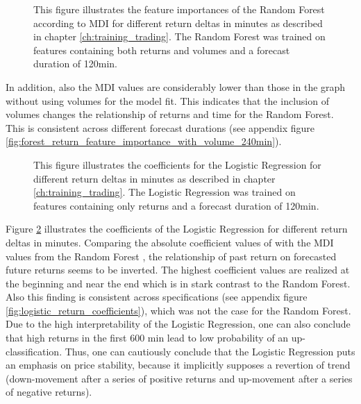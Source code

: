 \begin{figure}[H]
    \captionsetup{format=plain}
    \caption{ 
            This figure illustrates the feature importances of the Random Forest according to MDI \cite{louppe2015variableImportance}
            for different return deltas in minutes as described in chapter \ref{ch:training_trading}. 
            The Random Forest was trained on features containing both returns and volumes and a forecast duration of 120min.
        }
    \label{fig:forest_return_feature_importance_with_volume_120min}
\end{figure}

In addition, also the MDI values are considerably lower than those in the graph without using volumes for the model fit. 
This indicates that the inclusion of volumes changes the relationship of returns and time for the Random Forest.
This is consistent across different forecast durations (see appendix figure \ref{fig:forest_return_feature_importance_with_volume_240min}).


\begin{figure}[H]
    \captionsetup{format=plain}
    \caption{ 
            This figure illustrates the coefficients for the Logistic Regression 
            for different return deltas in minutes as described in chapter \ref{ch:training_trading}.
            The Logistic Regression was trained on features containing only returns and a forecast duration of 120min.
        }
    \label{fig:logistic_return_coefficients_no_volume_120min}
\end{figure}


Figure \ref{fig:logistic_return_coefficients_no_volume_120min} illustrates the coefficients of the Logistic Regression 
for different return deltas in minutes. Comparing the absolute coefficient values of with the MDI values 
from the Random Forest \cite{louppe2015variableImportance}, the relationship of past return on forecasted future returns seems to be inverted. 
The highest coefficient values are realized at the beginning and near the end which is
in stark contrast to the Random Forest. Also this finding is consistent across specifications (see appendix figure \ref{fig:logistic_return_coefficients}), 
which was not the case for the Random Forest.
Due to the high interpretability of the Logistic Regression, 
one can also conclude that high returns in the first 600 min lead to low probability of an up-classification.
Thus, one can cautiously conclude that the Logistic Regression puts an emphasis on price stability, 
because it implicitly supposes a revertion of trend (down-movement after a series of positive returns and up-movement after a series of negative returns).




